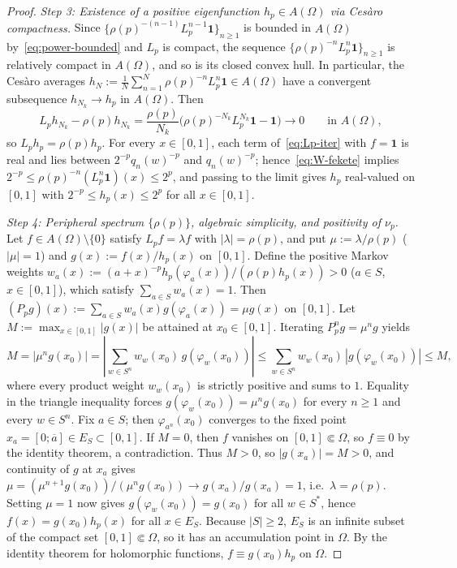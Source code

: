 \documentclass[11pt]{article}
\theoremstyle{definition}
\theoremstyle{remark}
\begin{document}
\begin{proof}
\emph{Step 3: Existence of a positive eigenfunction $h_p\in A(\Omega)$ via
Ces\`aro compactness.}
Since $\{\rho(p)^{-(n-1)}L_p^{n-1}\mathbf 1\}_{n\ge1}$ is bounded in $A(\Omega)$
by~\eqref{eq:power-bounded} and $L_p$ is compact, the sequence
$\{\rho(p)^{-n}L_p^n\mathbf 1\}_{n\ge1}$ is relatively compact in $A(\Omega)$,
and so is its closed convex hull. In particular, the Ces\`aro averages
$h_N:=\frac{1}{N}\sum_{n=1}^N \rho(p)^{-n}L_p^n\mathbf 1\in A(\Omega)$ have a
convergent subsequence $h_{N_k}\to h_p$ in $A(\Omega)$. Then
\[
L_p h_{N_k}-\rho(p)h_{N_k}
=\frac{\rho(p)}{N_k}\bigl(\rho(p)^{-N_k}L_p^{N_k}\mathbf 1-\mathbf 1\bigr)
\longrightarrow 0
\qquad\text{in }A(\Omega),
\]
so $L_p h_p=\rho(p)h_p$. For every $x\in[0,1]$, each term of~\eqref{eq:Lp-iter}
with $f=\mathbf 1$ is real and lies between $2^{-p}q_n(w)^{-p}$ and
$q_n(w)^{-p}$; hence~\eqref{eq:W-fekete} implies
$2^{-p}\le \rho(p)^{-n}(L_p^n\mathbf 1)(x)\le 2^p$, and passing to the limit
gives $h_p$ real-valued on $[0,1]$ with $2^{-p}\le h_p(x)\le 2^p$ for all
$x\in[0,1]$.

\emph{Step 4: Peripheral spectrum $\{\rho(p)\}$, algebraic simplicity, and
positivity of $\nu_p$.}
Let $f\in A(\Omega)\setminus\{0\}$ satisfy $L_p f=\lambda f$ with
$|\lambda|=\rho(p)$, and put $\mu:=\lambda/\rho(p)$ ($|\mu|=1$) and
$g(x):=f(x)/h_p(x)$ on $[0,1]$. Define the positive Markov weights
$w_a(x):=(a+x)^{-p}h_p(\varphi_a(x))/(\rho(p)h_p(x))>0$ ($a\in S$,
$x\in[0,1]$), which satisfy $\sum_{a\in S}w_a(x)=1$. Then
$(P_p g)(x):=\sum_{a\in S}w_a(x)g(\varphi_a(x))=\mu g(x)$ on $[0,1]$.
Let $M:=\max_{x\in[0,1]}|g(x)|$ be attained at $x_0\in[0,1]$. Iterating
$P_p^n g=\mu^n g$ yields
\[
M=|\mu^n g(x_0)|=\left|\sum_{w\in S^n}w_w(x_0)\,g(\varphi_w(x_0))\right|
\le\sum_{w\in S^n}w_w(x_0)\,|g(\varphi_w(x_0))|\le M,
\]
where every product weight $w_w(x_0)$ is strictly positive and sums to $1$.
Equality in the triangle inequality forces $g(\varphi_w(x_0))=\mu^n g(x_0)$
for every $n\ge1$ and every $w\in S^n$. Fix $a\in S$; then $\varphi_{a^n}(x_0)$
converges to the fixed point $x_a=[0;\overline{a}]\in E_S\subset[0,1]$.
If $M=0$, then $f$ vanishes on $[0,1]\Subset\Omega$, so $f\equiv0$ by the
identity theorem, a contradiction. Thus $M>0$, so $|g(x_a)|=M>0$, and
continuity of $g$ at $x_a$ gives
$\mu=(\mu^{n+1}g(x_0))/(\mu^n g(x_0))\to g(x_a)/g(x_a)=1$, i.e.\
$\lambda=\rho(p)$. Setting $\mu=1$ now gives $g(\varphi_w(x_0))=g(x_0)$ for
all $w\in S^*$, hence $f(x)=g(x_0)h_p(x)$ for all $x\in E_S$. Because
$|S|\ge2$, $E_S$ is an infinite subset of the compact set $[0,1]\Subset\Omega$,
so it has an accumulation point in $\Omega$. By the identity theorem for
holomorphic functions, $f\equiv g(x_0)h_p$ on $\Omega$.


\end{proof}
\end{document}
